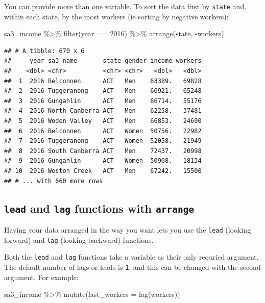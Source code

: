 \documentclass[
]{book}
\newenvironment{Shaded}{\begin{snugshade}}{\end{snugshade}}
\newcommand{\AttributeTok}[1]{\textcolor[rgb]{0.77,0.63,0.00}{#1}}
\newcommand{\DecValTok}[1]{\textcolor[rgb]{0.00,0.00,0.81}{#1}}
\newcommand{\FunctionTok}[1]{\textcolor[rgb]{0.00,0.00,0.00}{#1}}
\newcommand{\NormalTok}[1]{#1}
\newcommand{\SpecialCharTok}[1]{\textcolor[rgb]{0.00,0.00,0.00}{#1}}
\begin{document}
You can provide more than one variable. To sort the data first by \texttt{state} and, within each state, by the most workers (ie sorting by negative workers):

\begin{Shaded}
\begin{Highlighting}[]
\NormalTok{sa3\_income }\SpecialCharTok{\%\textgreater{}\%}
  \FunctionTok{filter}\NormalTok{(year }\SpecialCharTok{==} \DecValTok{2016}\NormalTok{) }\SpecialCharTok{\%\textgreater{}\%} 
  \FunctionTok{arrange}\NormalTok{(state, }\SpecialCharTok{{-}}\NormalTok{workers)}
\end{Highlighting}
\end{Shaded}

\begin{verbatim}
## # A tibble: 670 x 6
##     year sa3_name       state gender income workers
##    <dbl> <chr>          <chr> <chr>   <dbl>   <dbl>
##  1  2016 Belconnen      ACT   Men    63389.   69828
##  2  2016 Tuggeranong    ACT   Men    66921.   65248
##  3  2016 Gungahlin      ACT   Men    66714.   55176
##  4  2016 North Canberra ACT   Men    62258.   37481
##  5  2016 Woden Valley   ACT   Men    66853.   24690
##  6  2016 Belconnen      ACT   Women  50756.   22982
##  7  2016 Tuggeranong    ACT   Women  52058.   21949
##  8  2016 South Canberra ACT   Men    72437.   20998
##  9  2016 Gungahlin      ACT   Women  50908.   18134
## 10  2016 Weston Creek   ACT   Men    67242.   15500
## # ... with 660 more rows
\end{verbatim}

\hypertarget{lead-and-lag-functions-with-arrange}{%
\subsection{\texorpdfstring{\texttt{lead} and \texttt{lag} functions with \texttt{arrange}}{lead and lag functions with arrange}}\label{lead-and-lag-functions-with-arrange}}

Having your data arranged in the way you want lets you use the \texttt{lead} (looking forward) and \texttt{lag} (looking backward) functions.

Both the \texttt{lead} and \texttt{lag} functions take a variable as their only requried argument. The default number of lags or leads is \texttt{1}, and this can be changed with the second argument. For example:

\begin{Shaded}
\begin{Highlighting}[]
\NormalTok{sa3\_income }\SpecialCharTok{\%\textgreater{}\%}
  \FunctionTok{mutate}\NormalTok{(}\AttributeTok{last\_workers =} \FunctionTok{lag}\NormalTok{(workers))}
\end{Highlighting}
\end{Shaded}
\end{document}
